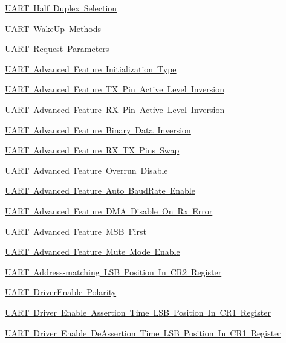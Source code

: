 \begin{DoxyCompactItemize}
\mbox{\hyperlink{group___u_a_r_t___half___duplex___selection}{U\+A\+R\+T Half Duplex Selection}}
\item 
\mbox{\hyperlink{group___u_a_r_t___wake_up___methods}{U\+A\+R\+T Wake\+Up Methods}}
\item 
\mbox{\hyperlink{group___u_a_r_t___request___parameters}{U\+A\+R\+T Request Parameters}}
\item 
\mbox{\hyperlink{group___u_a_r_t___advanced___features___initialization___type}{U\+A\+R\+T Advanced Feature Initialization Type}}
\item 
\mbox{\hyperlink{group___u_a_r_t___tx___inv}{U\+A\+R\+T Advanced Feature T\+X Pin Active Level Inversion}}
\item 
\mbox{\hyperlink{group___u_a_r_t___rx___inv}{U\+A\+R\+T Advanced Feature R\+X Pin Active Level Inversion}}
\item 
\mbox{\hyperlink{group___u_a_r_t___data___inv}{U\+A\+R\+T Advanced Feature Binary Data Inversion}}
\item 
\mbox{\hyperlink{group___u_a_r_t___rx___tx___swap}{U\+A\+R\+T Advanced Feature R\+X T\+X Pins Swap}}
\item 
\mbox{\hyperlink{group___u_a_r_t___overrun___disable}{U\+A\+R\+T Advanced Feature Overrun Disable}}
\item 
\mbox{\hyperlink{group___u_a_r_t___auto_baud_rate___enable}{U\+A\+R\+T Advanced Feature Auto Baud\+Rate Enable}}
\item 
\mbox{\hyperlink{group___u_a_r_t___d_m_a___disable__on___rx___error}{U\+A\+R\+T Advanced Feature D\+M\+A Disable On Rx Error}}
\item 
\mbox{\hyperlink{group___u_a_r_t___m_s_b___first}{U\+A\+R\+T Advanced Feature M\+S\+B First}}
\item 
\mbox{\hyperlink{group___u_a_r_t___mute___mode}{U\+A\+R\+T Advanced Feature Mute Mode Enable}}
\item 
\mbox{\hyperlink{group___u_a_r_t___c_r2___a_d_d_r_e_s_s___l_s_b___p_o_s}{U\+A\+R\+T Address-\/matching L\+S\+B Position In C\+R2 Register}}
\item 
\mbox{\hyperlink{group___u_a_r_t___driver_enable___polarity}{U\+A\+R\+T Driver\+Enable Polarity}}
\item 
\mbox{\hyperlink{group___u_a_r_t___c_r1___d_e_a_t___a_d_d_r_e_s_s___l_s_b___p_o_s}{U\+A\+R\+T Driver Enable Assertion Time L\+S\+B Position In C\+R1 Register}}
\item 
\mbox{\hyperlink{group___u_a_r_t___c_r1___d_e_d_t___a_d_d_r_e_s_s___l_s_b___p_o_s}{U\+A\+R\+T Driver Enable De\+Assertion Time L\+S\+B Position In C\+R1 Register}}

\end{DoxyCompactItemize}
